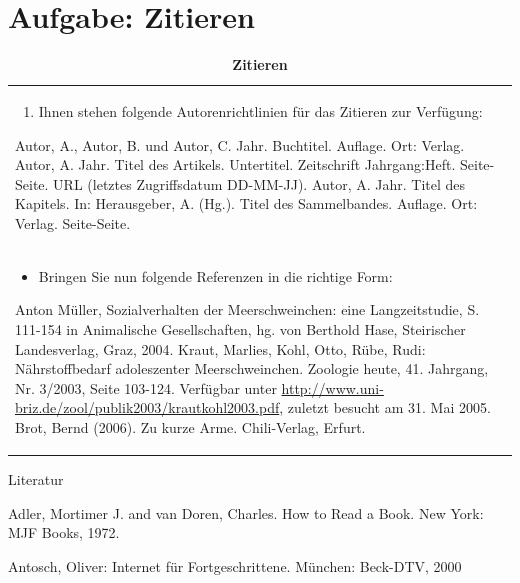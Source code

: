 \documentclass[]{book}
\providecommand{\tightlist}{%
  \setlength{\itemsep}{0pt}\setlength{\parskip}{0pt}}
\theoremstyle{definition}
\theoremstyle{definition}
\theoremstyle{definition}
\theoremstyle{remark}
\begin{document}
\section{Aufgabe: Zitieren}\label{aufgabe-zitieren}

\begin{longtable}[]{@{}l@{}}
\caption{\textbf{\label{tab:aufgabe7-test} Zitieren}}\tabularnewline
\toprule
\begin{minipage}[t]{0.97\columnwidth}\raggedright\strut
\begin{enumerate}
\def\labelenumi{\arabic{enumi}.}
\tightlist
\item
  Ihnen stehen folgende Autorenrichtlinien für das Zitieren zur
  Verfügung:
\end{enumerate}

Autor, A., Autor, B. und Autor, C. Jahr. Buchtitel. Auflage. Ort:
Verlag. Autor, A. Jahr. Titel des Artikels. Untertitel. Zeitschrift
Jahrgang:Heft. Seite-Seite. URL (letztes Zugriffsdatum DD-MM-JJ). Autor,
A. Jahr. Titel des Kapitels. In: Herausgeber, A. (Hg.). Titel des
Sammelbandes. Auflage. Ort: Verlag. Seite-Seite. \vspace{-6mm}\strut
\end{minipage}\tabularnewline
\begin{minipage}[t]{0.97\columnwidth}\raggedright\strut
\begin{itemize}
\tightlist
\item
  Bringen Sie nun folgende Referenzen in die richtige Form:
\end{itemize}

Anton Müller, Sozialverhalten der Meerschweinchen: eine Langzeitstudie,
S. 111-154 in Animalische Gesellschaften, hg. von Berthold Hase,
Steirischer Landesverlag, Graz, 2004. Kraut, Marlies, Kohl, Otto, Rübe,
Rudi: Nährstoffbedarf adoleszenter Meerschweinchen. Zoologie heute, 41.
Jahrgang, Nr. 3/2003, Seite 103-124. Verfügbar unter
\url{http://www.uni-briz.de/zool/publik2003/krautkohl2003.pdf}, zuletzt
besucht am 31. Mai 2005. Brot, Bernd (2006). Zu kurze Arme.
Chili-Verlag, Erfurt.\strut
\end{minipage}\tabularnewline
\bottomrule
\end{longtable}

Literatur

Adler, Mortimer J. and van Doren, Charles. How to Read a Book. New York:
MJF Books, 1972.

Antosch, Oliver: Internet für Fortgeschrittene. München: Beck-DTV, 2000
\end{document}
